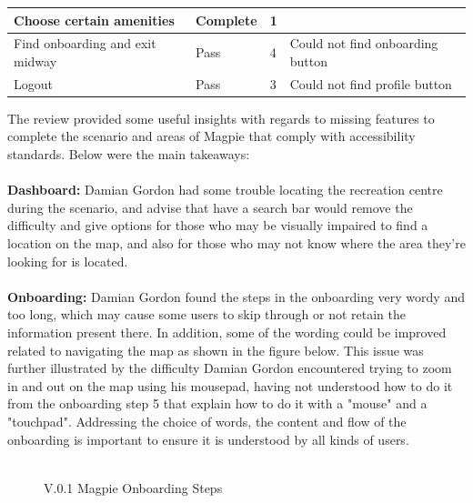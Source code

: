 \begin{table}[h!]
\begin{tabular}{|p{}|p{}|p{}|p{}|}
        \hline
        Choose certain amenities         & Complete        & 1                   &                                                                                   \\
        \hline
        Find onboarding and exit midway  & Pass            & 4                   & Could not find onboarding button                                                  \\
        \hline
        Logout                           & Pass            & 3                   & Could not find profile button                                                     \\
        \hline
    \end{tabular}
\end{table}

\newpage
\noindent The review provided some useful insights with regards to missing features to complete the scenario and areas of Magpie that comply with accessibility standards. Below were the main takeaways:\\\\
\textbf{Dashboard: }
Damian Gordon had some trouble locating the recreation centre during the scenario, and advise that have a search bar would remove the difficulty and give options for those who may be visually impaired to find a location on the map, and also for those who may not know where the area they're looking for is located.\\\\
\textbf{Onboarding: }
Damian Gordon found the steps in the onboarding very wordy and too long, which may cause some users to skip through or not retain the information present there. In addition, some of the wording could be improved related to navigating the map as shown in the figure below. This issue was further illustrated by the difficulty Damian Gordon encountered trying to zoom in and out on the map using his mousepad, having not understood how to do it from the onboarding step 5 that explain how to do it with a "mouse" and a "touchpad". Addressing the choice of words, the content and flow of the onboarding is important to ensure it is understood by all kinds of users.\\\\
\begin{figure}
    \centering
    \caption{V.0.1 Magpie Onboarding Steps}
\end{figure}
